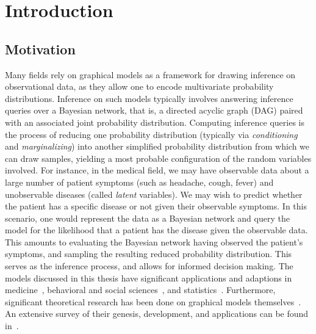 \chapter{Introduction}

\section{Motivation}
\null \quad \quad Many fields rely on graphical models as a framework for drawing inference on observational data, as they allow one to encode multivariate probability distributions. Inference on such models typically involves answering inference queries over a Bayesian network, that is, a directed acyclic graph (DAG) paired with an associated joint probability distribution. Computing inference queries is the process of reducing one probability distribution (typically via \textit{conditioning} and \textit{marginalizing}) into another simplified probability distribution from which we can draw samples, yielding a most probable configuration of the random variables involved. \newline
\null \quad \quad For instance, in the medical field, we may have observable data about a large number of patient symptoms (such as headache, cough, fever) and unobservable diseases (called \textit{latent} variables). We may wish to predict whether the patient has a specific disease or not given their observable symptoms. In this scenario, one would represent the data as a Bayesian network and query the model for the likelihood that a patient has the disease given the observable data. This amounts to evaluating the Bayesian network having observed the patient's symptoms, and sampling the resulting reduced probability distribution. This serves as the inference process, and allows for informed decision making. \newline 
\null \quad \quad The models discussed in this thesis have significant applications and adaptions in medicine~\cite{greenland1, greenland2, miller, pauker, shwe}, behavioral and social sciences~\cite{morgan, blalock}, and statistics~\cite{cox, lauritzen}. Furthermore, significant theoretical research has been done on graphical models themselves~\cite{verma, chickering, andersson}. An extensive survey of their genesis, development, and applications can be found in~\cite{pearlsurvey}. \newline
